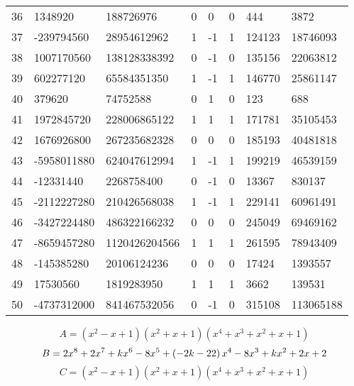 \documentclass{amsart}
\begin{document}
\begin{longtable}{|l|l|l|lllll|}
36&1348920&188726976&0&0&0&444&3872\\
37&-239794560&28954612962&1&-1&1&124123&18746093\\
38&1007170560&138128338392&0&-1&0&135156&22063812\\
39&602277120&65584351350&1&-1&1&146770&25861147\\
40&379620&74752588&0&1&0&123&688\\
41&1972845720&228006865122&1&1&1&171781&35105453\\
42&1676926800&267235682328&0&0&0&185193&40481818\\
43&-5958011880&624047612994&1&-1&1&199219&46539159\\
44&-12331440&2268758400&0&-1&0&13367&830137\\
45&-2112227280&210426568038&1&-1&1&229141&60961491\\
46&-3427224480&486322166232&0&0&0&245049&69469162\\
47&-8659457280&1120426204566&1&1&1&261595&78943409\\
48&-145385280&20106124236&0&0&0&17424&1393557\\
49&17530560&1819283950&1&1&1&3662&139531\\
50&-4737312000&841467532056&0&-1&0&315108&113065188\\
\hline
\end{longtable}
$$A=(x^2
 - x
 + 1)(x^2
 + x
 + 1)(x^4
 + x^3
 + x^2
 + x
 + 1)$$
$$B=2\*x^8
 + 2\*x^7
 + k\*x^6
 - 8\*x^5
 + \left(-2\*k
 - 22\right) \*x^4
 - 8\*x^3
 + k\*x^2
 + 2\*x
 + 2$$
$$C=(x^2
 - x
 + 1)(x^2
 + x
 + 1)(x^4
 + x^3
 + x^2
 + x
 + 1)$$
\end{document}
